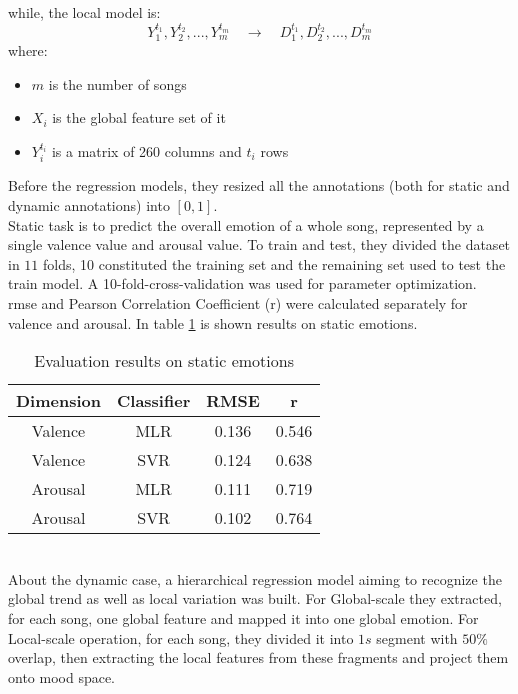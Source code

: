 while, the local model is:
\begin{equation}
	{Y_1^{t_1},Y_2^{t_2},...,Y_m^{t_m}} \quad \rightarrow \quad {D_1^{t_1},D_2^{t_2},...,D_m^{t_m}}
\end{equation}
where:
\begin{itemize}
	\item $m$ is the number of songs
	\item $X_i$ is the global feature set of it
	\item $Y_i^{t_i}$ is a matrix of 260 columns and $t_i$ rows
\end{itemize}
Before the regression models, they resized all the annotations (both for static and dynamic annotations) into $[0,1]$.
\\ \indent
Static task is to predict the overall emotion of a whole song, represented by a single valence value and arousal value. To train and test, they divided the dataset in $11$ folds, 10 constituted the training set and the remaining set used to test the train model. A 10-fold-cross-validation was used for parameter optimization.
\\
\gls{rmse} and Pearson Correlation Coefficient (r) were calculated separately for valence and arousal. In table \ref{table:PMEmo_results_static} is shown results on static emotions.
\begin{table}[h!]
	\centering
	\begin{tabular}{|c|c|c|c|}
		\hline
		Dimension & Classifier & RMSE & r \\ [0.5ex] 
		\hline\hline Valence & MLR & 0.136 & 0.546 \\ 
		\hline Valence & SVR & 0.124 & 0.638 \\
		\hline Arousal & MLR & 0.111 & 0.719 \\
		\hline Arousal & SVR & 0.102 & 0.764 \\
		\hline
	\end{tabular}
	\caption{Evaluation results on static emotions}
	\label{table:PMEmo_results_static}
\end{table}
\\
About the dynamic case, a hierarchical regression model aiming to recognize the global trend as well as local variation was built. For Global-scale they extracted, for each song, one global feature and mapped it into one global emotion. For Local-scale operation, for each song, they divided it into $1s$ segment with $50\%$ overlap, then extracting the local features from these fragments and project them onto mood space.
\\
